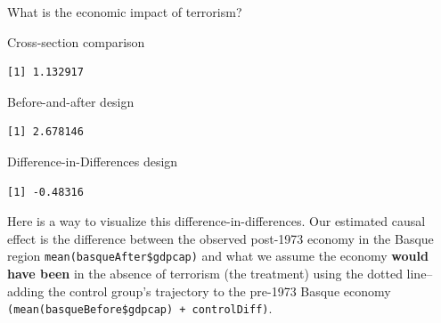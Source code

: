 \documentclass[
  letterpaper,
  DIV=11,
  numbers=noendperiod]{scrreprt}
\newenvironment{Shaded}{\begin{snugshade}}{\end{snugshade}}
\newcommand{\FunctionTok}[1]{\textcolor[rgb]{0.28,0.35,0.67}{#1}}
\newcommand{\NormalTok}[1]{\textcolor[rgb]{0.00,0.23,0.31}{#1}}
\newcommand{\OtherTok}[1]{\textcolor[rgb]{0.00,0.23,0.31}{#1}}
\newcommand{\SpecialCharTok}[1]{\textcolor[rgb]{0.37,0.37,0.37}{#1}}
\begin{document}
What is the economic impact of terrorism?

Cross-section comparison

\begin{Shaded}
\end{Shaded}

\begin{verbatim}
[1] 1.132917
\end{verbatim}

Before-and-after design

\begin{Shaded}
\end{Shaded}

\begin{verbatim}
[1] 2.678146
\end{verbatim}

Difference-in-Differences design

\begin{Shaded}
\end{Shaded}

\begin{verbatim}
[1] -0.48316
\end{verbatim}

Here is a way to visualize this difference-in-differences. Our estimated
causal effect is the difference between the observed post-1973 economy
in the Basque region \texttt{mean(basqueAfter\$gdpcap)} and what we
assume the economy \textbf{would have been} in the absence of terrorism
(the treatment) using the dotted line-- adding the control group's
trajectory to the pre-1973 Basque economy
\texttt{(mean(basqueBefore\$gdpcap)\ +\ controlDiff)}.
\end{document}

